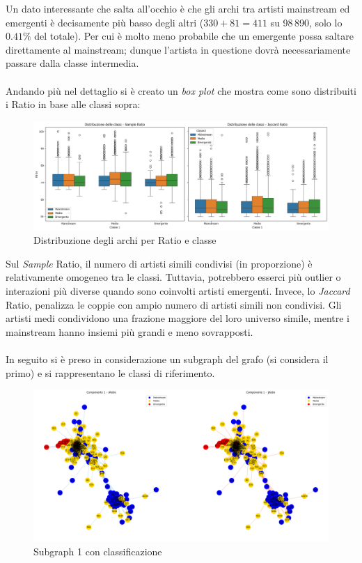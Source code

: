 \documentclass[sigchi]{acmart}
\begin{document}
\noindent Un dato interessante che salta all'occhio è che gli archi tra artisti mainstream ed emergenti è decisamente più basso degli altri ($330+81=411$ su 98\,890, solo lo $0.41\%$ del totale). Per cui è molto meno probabile che un emergente possa saltare direttamente al mainstream; dunque l'artista in questione dovrà necessariamente passare dalla classe intermedia. \\ \\ Andando più nel dettaglio si è creato un {\itshape box plot} che mostra come sono distribuiti i Ratio in base alle classi sopra:

\begin{figure}[H]
\centering
\includegraphics[width=0.45
\textwidth]{../open_problem/plots/3_2/clDist.png}
\caption{Distribuzione degli archi per Ratio e classe}
\label{fig:clDist}
\end{figure}

\noindent Sul {\itshape Sample} Ratio, il numero di artisti simili condivisi (in proporzione) è relativamente omogeneo tra le classi. Tuttavia, potrebbero esserci più outlier o interazioni più diverse quando sono coinvolti artisti emergenti. Invece, lo {\itshape Jaccard} Ratio, penalizza le coppie con ampio numero di artisti simili non condivisi. Gli artisti medi condividono una frazione maggiore del loro universo simile, mentre i mainstream hanno insiemi più grandi e meno sovrapposti. \\ \\ In seguito si è preso in considerazione un subgraph del grafo (si considera il primo) e si rappresentano le classi di riferimento.

\begin{figure}[H]
\centering
\includegraphics[width=0.45
\textwidth]{../open_problem/plots/3_2/clSubgraph_1.png}
\caption{Subgraph 1 con classificazione}
\label{fig:clSubgraph_1}
\end{figure}
\end{document}
